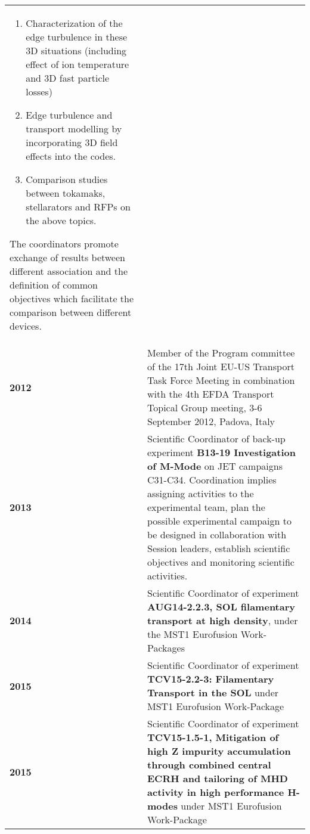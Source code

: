 {\begin{longtable}{>{\bfseries}l p{11cm}}
\begin{enumerate}
\item Characterization of the edge turbulence in these 3D situations (including effect of ion temperature and 3D fast particle losses)
\item Edge turbulence and transport modelling by incorporating 3D field effects into the codes.
\item Comparison studies between tokamaks, stellarators and RFPs on the above topics.
\end{enumerate}
The coordinators promote exchange of results between different
association and the definition of common objectives which facilitate
the comparison between different devices. \\
2012 & Member of the Program committee of the 17th Joint EU-US Transport Task Force
Meeting in combination with the 4th EFDA Transport Topical Group
meeting, 3-6 September 2012, Padova, Italy \\
2013 & Scientific Coordinator of back-up experiment \textbf{B13-19
  Investigation of M-Mode} on JET
campaigns C31-C34. Coordination implies assigning activities to the
experimental team, plan the possible experimental campaign to be
designed in collaboration with Session leaders,  establish scientific
objectives and monitoring scientific activities. \\
2014 & Scientific Coordinator of experiment \textbf{AUG14-2.2.3, SOL
filamentary transport at high density}, under the MST1 Eurofusion
Work-Packages \\
2015 & Scientific Coordinator of experiment
  \textbf{TCV15-2.2-3: Filamentary Transport in the SOL} under MST1
  Eurofusion Work-Package \\
2015 & Scientific Coordinator of experiment
  \textbf{TCV15-1.5-1, Mitigation of high Z impurity accumulation
    through combined central ECRH and tailoring of MHD activity in
    high performance H-modes} under MST1 Eurofusion Work-Package \\

\end{longtable}}

